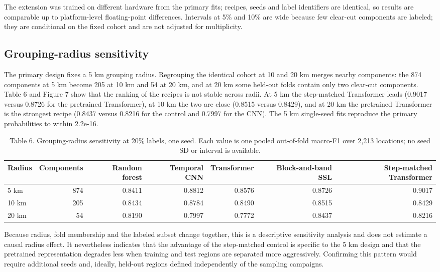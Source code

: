 \documentclass[11pt,a4paper]{article}
\begin{document}
The extension was trained on different hardware from the primary fits; recipes, seeds and label identifiers are identical, so results are comparable up to platform-level floating-point differences. Intervals at 5\% and 10\% are wide because few clear-cut components are labeled; they are conditional on the fixed cohort and are not adjusted for multiplicity.

\subsection{Grouping-radius sensitivity}
The primary design fixes a 5 km grouping radius. Regrouping the identical cohort at 10 and 20 km merges nearby components: the 874 components at 5 km become 205 at 10 km and 54 at 20 km, and at 20 km some held-out folds contain only two clear-cut components. Table 6 and Figure 7 show that the ranking of the recipes is not stable across radii. At 5 km the step-matched Transformer leads (0.9017 versus 0.8726 for the pretrained Transformer), at 10 km the two are close (0.8515 versus 0.8429), and at 20 km the pretrained Transformer is the strongest recipe (0.8437 versus 0.8216 for the control and 0.7997 for the CNN). The 5 km single-seed fits reproduce the primary probabilities to within 2.2e-16.

\begin{table}[htbp]
\centering
\small
\caption{Table 6. Grouping-radius sensitivity at 20\% labels, one seed. Each value is one pooled out-of-fold macro-F1 over 2,213 locations; no seed SD or interval is available.}
\begin{tabular}{lrrrrrr}
\toprule
Radius & Components & Random forest & Temporal CNN & Transformer & Block-and-band SSL & Step-matched Transformer \\ \midrule
5 km & 874 & 0.8411 & 0.8812 & 0.8576 & 0.8726 & 0.9017 \\
10 km & 205 & 0.8434 & 0.8784 & 0.8490 & 0.8515 & 0.8429 \\
20 km & 54 & 0.8190 & 0.7997 & 0.7772 & 0.8437 & 0.8216 \\
\bottomrule
\end{tabular}
\end{table}

Because radius, fold membership and the labeled subset change together, this is a descriptive sensitivity analysis and does not estimate a causal radius effect. It nevertheless indicates that the advantage of the step-matched control is specific to the 5 km design and that the pretrained representation degrades less when training and test regions are separated more aggressively. Confirming this pattern would require additional seeds and, ideally, held-out regions defined independently of the sampling campaigns.
\end{document}
